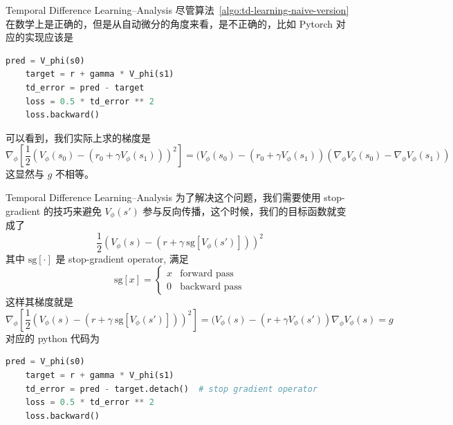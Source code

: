 \documentclass[aspectratio=169]{beamer}
\begin{document}
\begin{frame}[fragile]{Temporal Difference Learning--Analysis}
    尽管算法~\ref{algo:td-learning-naive-version} 在数学上是正确的，但是从自动微分的角度来看，是不正确的，比如 Pytorch 对应的实现应该是

    \begin{lstlisting}[language=python]
    pred = V_phi(s0)
    target = r + gamma * V_phi(s1)
    td_error = pred - target    
    loss = 0.5 * td_error ** 2
    loss.backward()
    \end{lstlisting}
    
    可以看到，我们实际上求的梯度是
    \begin{equation}
        \nabla_\phi\left[\frac12\left(V_\phi(s_0)-(r_0+\gamma V_\phi(s_1))\right)^2\right]=(V_\phi(s_0)-(r_0+\gamma V_\phi(s_1))(\nabla_\phi V_\phi(s_0)-\nabla_\phi V_\phi(s_1))
    \end{equation}
    这显然与 $g$ 不相等。
\end{frame}

\begin{frame}[fragile]{Temporal Difference Learning--Analysis}
    \small
    为了解决这个问题，我们需要使用 stop-gradient 的技巧来避免 $V_\phi(s')$ 参与反向传播，这个时候，我们的目标函数就变成了
    \begin{equation}
    \frac12\left(V_\phi(s)-(r+\gamma\ \mathrm{sg}[V_\phi(s')])\right)^2
    \end{equation}
    其中 $\mathrm{sg}[\cdot]$ 是 stop-gradient operator, 满足
    \begin{equation}
    \mathrm{sg}[x] = \begin{cases}
    x &\text{forward pass}\\
    0 &\text{backward pass}
    \end{cases}
    \end{equation}
    这样其梯度就是
    \begin{equation}
    \nabla_\phi\left[\frac12\left(V_\phi(s)-(r+\gamma\ \mathrm{sg}[V_\phi(s')])\right)^2\right]=(V_\phi(s)-(r+\gamma V_\phi(s'))\nabla_\phi V_\phi(s)=g
    \end{equation}
    对应的 python 代码为
    \begin{lstlisting}[language=python]
    pred = V_phi(s0)
    target = r + gamma * V_phi(s1)
    td_error = pred - target.detach()  # stop gradient operator
    loss = 0.5 * td_error ** 2
    loss.backward()
    \end{lstlisting}
\end{frame}
\end{document}
